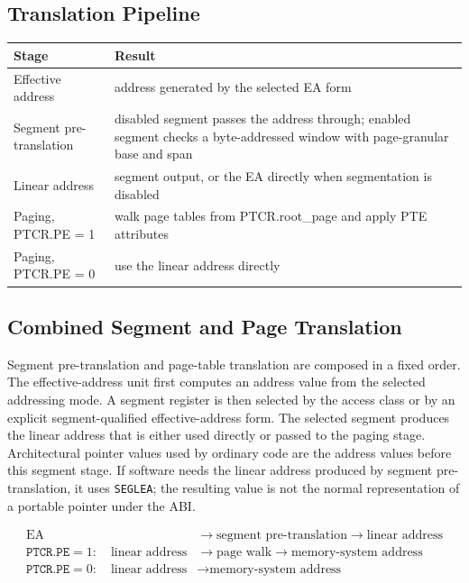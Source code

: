 \subsection{Translation Pipeline}
\begingroup\small
\begin{longtable}{@{}p{1.65in}p{3.85in}@{}}
\toprule
\textbf{Stage} & \textbf{Result}\\
\midrule
Effective address & address generated by the selected EA form\\
Segment pre-translation & disabled segment passes the address through; enabled segment checks a byte-addressed window with page-granular base and span\\
Linear address & segment output, or the EA directly when segmentation is disabled\\
Paging, PTCR.PE = 1 & walk page tables from PTCR.root\_page and apply PTE attributes\\
Paging, PTCR.PE = 0 & use the linear address directly\\
\bottomrule
\end{longtable}
\endgroup

\subsection{Combined Segment and Page Translation}
Segment pre-translation and page-table translation are composed in a fixed order.
The effective-address unit first computes an address value from the selected addressing
mode. A segment register is then selected by the access class or by an explicit
segment-qualified effective-address form. The selected segment produces the linear
address that is either used directly or passed to the paging stage.
Architectural pointer values used by ordinary code are the address values before this
segment stage. If software needs the linear address produced by segment pre-translation,
it uses \texttt{SEGLEA}; the resulting value is not the normal representation of a
portable pointer under the ABI.

\[
\begin{aligned}
\mathrm{EA} &\rightarrow \text{segment pre-translation} \rightarrow \text{linear address}\\
\texttt{PTCR.PE}=1:\quad \text{linear address} &\rightarrow \text{page walk} \rightarrow \text{memory-system address}\\
\texttt{PTCR.PE}=0:\quad \text{linear address} &\rightarrow \text{memory-system address}
\end{aligned}
\]

